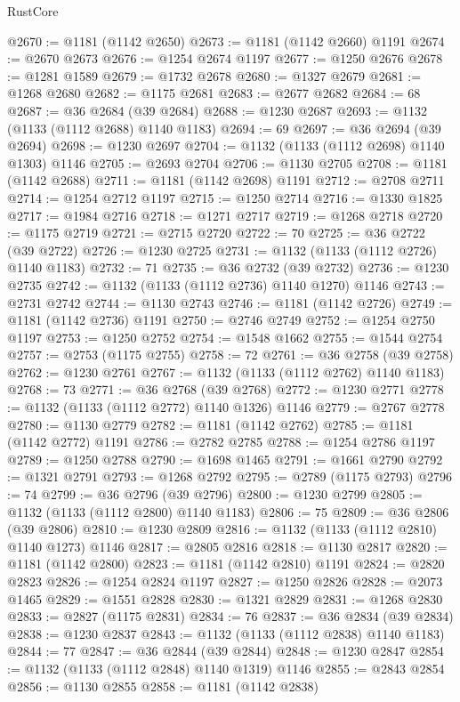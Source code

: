 \begin{lexlean}{RustCore}
\begin{coremodule}
@2670 := @1181 (@1142 @2650)
@2673 := @1181 (@1142 @2660) @1191
@2674 := @2670 @2673
@2676 := @1254 @2674 @1197
@2677 := @1250 @2676
@2678 := @1281 @1589
@2679 := @1732 @2678
@2680 := @1327 @2679
@2681 := @1268 @2680
@2682 := @1175 @2681
@2683 := @2677 @2682
@2684 := 68
@2687 := @36 @2684 (@39 @2684)
@2688 := @1230 @2687
@2693 := @1132 (@1133 (@1112 @2688) @1140 @1183)
@2694 := 69
@2697 := @36 @2694 (@39 @2694)
@2698 := @1230 @2697
@2704 := @1132 (@1133 (@1112 @2698) @1140 @1303) @1146
@2705 := @2693 @2704
@2706 := @1130 @2705
@2708 := @1181 (@1142 @2688)
@2711 := @1181 (@1142 @2698) @1191
@2712 := @2708 @2711
@2714 := @1254 @2712 @1197
@2715 := @1250 @2714
@2716 := @1330 @1825
@2717 := @1984 @2716
@2718 := @1271 @2717
@2719 := @1268 @2718
@2720 := @1175 @2719
@2721 := @2715 @2720
@2722 := 70
@2725 := @36 @2722 (@39 @2722)
@2726 := @1230 @2725
@2731 := @1132 (@1133 (@1112 @2726) @1140 @1183)
@2732 := 71
@2735 := @36 @2732 (@39 @2732)
@2736 := @1230 @2735
@2742 := @1132 (@1133 (@1112 @2736) @1140 @1270) @1146
@2743 := @2731 @2742
@2744 := @1130 @2743
@2746 := @1181 (@1142 @2726)
@2749 := @1181 (@1142 @2736) @1191
@2750 := @2746 @2749
@2752 := @1254 @2750 @1197
@2753 := @1250 @2752
@2754 := @1548 @1662
@2755 := @1544 @2754
@2757 := @2753 (@1175 @2755)
@2758 := 72
@2761 := @36 @2758 (@39 @2758)
@2762 := @1230 @2761
@2767 := @1132 (@1133 (@1112 @2762) @1140 @1183)
@2768 := 73
@2771 := @36 @2768 (@39 @2768)
@2772 := @1230 @2771
@2778 := @1132 (@1133 (@1112 @2772) @1140 @1326) @1146
@2779 := @2767 @2778
@2780 := @1130 @2779
@2782 := @1181 (@1142 @2762)
@2785 := @1181 (@1142 @2772) @1191
@2786 := @2782 @2785
@2788 := @1254 @2786 @1197
@2789 := @1250 @2788
@2790 := @1698 @1465
@2791 := @1661 @2790
@2792 := @1321 @2791
@2793 := @1268 @2792
@2795 := @2789 (@1175 @2793)
@2796 := 74
@2799 := @36 @2796 (@39 @2796)
@2800 := @1230 @2799
@2805 := @1132 (@1133 (@1112 @2800) @1140 @1183)
@2806 := 75
@2809 := @36 @2806 (@39 @2806)
@2810 := @1230 @2809
@2816 := @1132 (@1133 (@1112 @2810) @1140 @1273) @1146
@2817 := @2805 @2816
@2818 := @1130 @2817
@2820 := @1181 (@1142 @2800)
@2823 := @1181 (@1142 @2810) @1191
@2824 := @2820 @2823
@2826 := @1254 @2824 @1197
@2827 := @1250 @2826
@2828 := @2073 @1465
@2829 := @1551 @2828
@2830 := @1321 @2829
@2831 := @1268 @2830
@2833 := @2827 (@1175 @2831)
@2834 := 76
@2837 := @36 @2834 (@39 @2834)
@2838 := @1230 @2837
@2843 := @1132 (@1133 (@1112 @2838) @1140 @1183)
@2844 := 77
@2847 := @36 @2844 (@39 @2844)
@2848 := @1230 @2847
@2854 := @1132 (@1133 (@1112 @2848) @1140 @1319) @1146
@2855 := @2843 @2854
@2856 := @1130 @2855
@2858 := @1181 (@1142 @2838)

\end{coremodule}
\end{lexlean}
